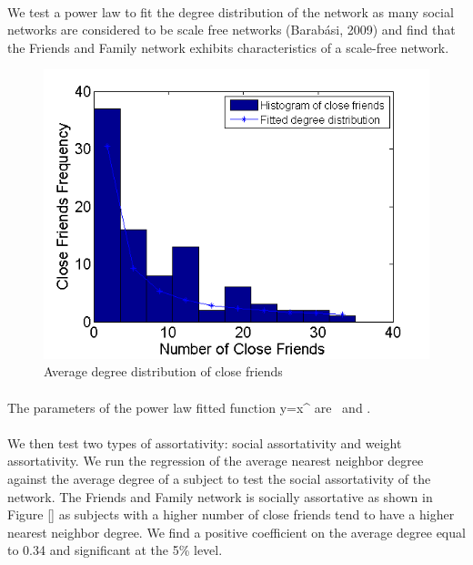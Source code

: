 \documentclass[11pt]{article}
\begin{document}
\paragraph{}
We test a power law to fit the degree distribution of the network as many social networks are considered to be scale free networks (Barabási, 2009) and find that the Friends and Family network exhibits characteristics of a scale-free network.

\begin{figure}[!ht]
\center
   \includegraphics[scale = 0.9]{friends_distribution_figure1.png}
   \caption{\label{1} Average degree distribution of close friends}
\end{figure}

\paragraph{}
The parameters of the power law fitted function y=\alpha x^\beta \]   are  \] \ and \].

\paragraph{}
We then test two types of assortativity: social assortativity and weight assortativity. We run the regression of the average nearest neighbor degree against the average degree of a subject to test the social assortativity of the network. The Friends and Family network is socially assortative as shown in Figure [] as subjects with a higher number of close friends tend to have a higher nearest neighbor degree. We find a positive coefficient on the average degree equal to 0.34 and significant at the 5\% level.
\end{document}
